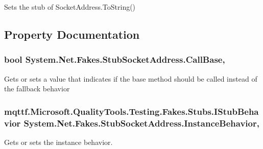 Sets the stub of Socket\-Address.\-To\-String()



\subsection{Property Documentation}
\hypertarget{class_system_1_1_net_1_1_fakes_1_1_stub_socket_address_ad1b53cbf0fddf7d9cb75831dcfb5cbae}{
\subsubsection[{Call\-Base}]{\setlength{\rightskip}{0pt plus 5cm}bool System.\-Net.\-Fakes.\-Stub\-Socket\-Address.\-Call\-Base\hspace{0.3cm}{\ttfamily [get]}, {\ttfamily [set]}}}\label{class_system_1_1_net_1_1_fakes_1_1_stub_socket_address_ad1b53cbf0fddf7d9cb75831dcfb5cbae}


Gets or sets a value that indicates if the base method should be called instead of the fallback behavior

\hypertarget{class_system_1_1_net_1_1_fakes_1_1_stub_socket_address_a42b74d6fb68597e577106b58987a0f06}{
\subsubsection[{Instance\-Behavior}]{\setlength{\rightskip}{0pt plus 5cm}mqttf.\-Microsoft.\-Quality\-Tools.\-Testing.\-Fakes.\-Stubs.\-I\-Stub\-Behavior System.\-Net.\-Fakes.\-Stub\-Socket\-Address.\-Instance\-Behavior\hspace{0.3cm}{\ttfamily [get]}, {\ttfamily [set]}}}\label{class_system_1_1_net_1_1_fakes_1_1_stub_socket_address_a42b74d6fb68597e577106b58987a0f06}


Gets or sets the instance behavior.

